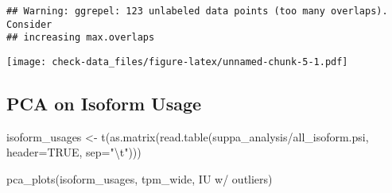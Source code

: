 \documentclass[
]{article}
\newenvironment{Shaded}{\begin{snugshade}}{\end{snugshade}}
\newcommand{\AttributeTok}[1]{\textcolor[rgb]{0.77,0.63,0.00}{#1}}
\newcommand{\ConstantTok}[1]{\textcolor[rgb]{0.00,0.00,0.00}{#1}}
\newcommand{\DecValTok}[1]{\textcolor[rgb]{0.00,0.00,0.81}{#1}}
\newcommand{\FunctionTok}[1]{\textcolor[rgb]{0.00,0.00,0.00}{#1}}
\newcommand{\NormalTok}[1]{#1}
\newcommand{\OtherTok}[1]{\textcolor[rgb]{0.56,0.35,0.01}{#1}}
\newcommand{\SpecialCharTok}[1]{\textcolor[rgb]{0.00,0.00,0.00}{#1}}
\newcommand{\StringTok}[1]{\textcolor[rgb]{0.31,0.60,0.02}{#1}}
\begin{document}
\begin{Shaded}
\end{Shaded}

\begin{verbatim}
## Warning: ggrepel: 123 unlabeled data points (too many overlaps). Consider
## increasing max.overlaps
\end{verbatim}

\texttt{[image: check-data\_files/figure-latex/unnamed-chunk-5-1.pdf]}

\hypertarget{pca-on-isoform-usage}{%
\subsection{PCA on Isoform Usage}\label{pca-on-isoform-usage}}

\begin{Shaded}
\begin{Highlighting}[]
\NormalTok{isoform\_usages }\OtherTok{\textless{}{-}} \FunctionTok{t}\NormalTok{(}\FunctionTok{as.matrix}\NormalTok{(}\FunctionTok{read.table}\NormalTok{(}\StringTok{\textquotesingle{}suppa\_analysis/all\_isoform.psi\textquotesingle{}}\NormalTok{, }\AttributeTok{header=}\ConstantTok{TRUE}\NormalTok{, }\AttributeTok{sep=}\StringTok{"}\SpecialCharTok{\textbackslash{}t}\StringTok{"}\NormalTok{)))}

\FunctionTok{pca\_plots}\NormalTok{(isoform\_usages, tpm\_wide, }\StringTok{\textquotesingle{}IU w/ outliers\textquotesingle{}}\NormalTok{)}
\end{Highlighting}
\end{Shaded}
\end{document}
